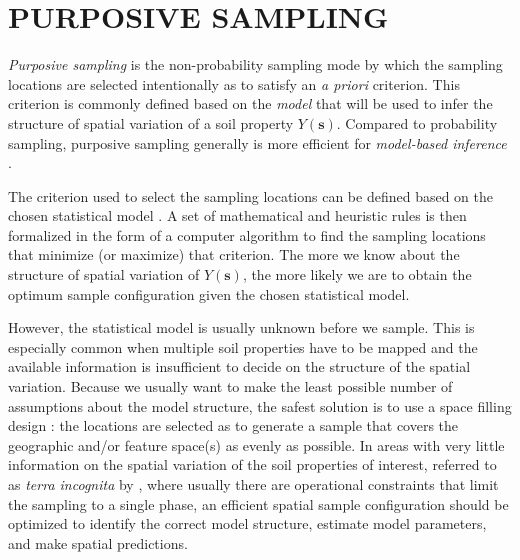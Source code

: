 
\section{PURPOSIVE SAMPLING}

\emph{Purposive sampling} is the non-probability sampling mode by which the sampling locations are selected 
intentionally as to satisfy an \textit{a priori} criterion. This criterion is commonly defined based on the 
\emph{model} that will be used to infer the structure of spatial variation of a soil property 
$Y(\boldsymbol{s})$. Compared to probability sampling, purposive sampling generally is more efficient for 
\emph{model-based inference} \cite{deGruijterEtAl2006}.

The criterion used to select the sampling locations can be defined based on the chosen statistical model 
\cite{deGruijterEtAl2006, Mueller2007, WebsterEtAl2013}. A set of mathematical and heuristic rules is then 
formalized in the form of a computer algorithm to find the sampling locations that minimize (or maximize) that 
criterion. The more we know about the structure of spatial variation of $Y(\boldsymbol{s})$, the more likely we 
are to obtain the optimum sample configuration given the chosen statistical model.

However, the statistical model is usually unknown before we sample. This is especially common when multiple 
soil properties have to be mapped and the available information is insufficient to decide on the structure of 
the spatial variation. Because we usually want to make the least possible number of assumptions about the model 
structure, the safest solution is to use a space filling design \cite{HenglEtAl2003a, deGruijterEtAl2006, 
Mueller2007, WalvoortEtAl2010}: the locations are selected as to generate a sample that covers the geographic 
and/or feature space(s) as evenly as possible. In areas with very little information on the spatial variation 
of the soil properties of interest, referred to as \emph{terra incognita} by \citet{WebsterEtAl2007}, where 
usually there are operational constraints that limit the sampling to a single phase, an efficient spatial 
sample configuration should be optimized to identify the correct model structure, estimate model parameters, 
and make spatial predictions.

